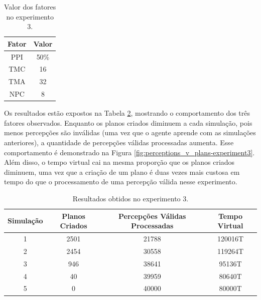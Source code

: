 \begin{table}[h!]
    \begin{center}
        \caption{ Valor dos fatores no experimento 3. }
        \label{table:experiment3factors}
        \begin{tabular}{ |c|c| }
            \hline
            \textbf{Fator} & \textbf{Valor}\\
            \hline
            PPI & 50\%\\
            \hline
            TMC & 16\\
            \hline
            TMA & 32\\
            \hline
            NPC & 8\\
            \hline
        \end{tabular}{}
    \end{center}{}
\end{table}

Os resultados estão expostos na Tabela \ref{table:experiment3results}, mostrando o comportamento dos três fatores observados. Enquanto os planos criados diminuem a cada simulação, pois menos percepções são inválidas (uma vez que o agente aprende com as simulações anteriores), a quantidade de percepções válidas processadas aumenta. Esse comportamento é demonstrado na Figura \ref{fig:perceptions_v_plans-experiment3}. Além disso, o tempo virtual cai na mesma proporção que os planos criados diminuem, uma vez que a criação de um plano é duas vezes mais custosa em tempo do que o processamento de uma percepção válida nesse experimento.

\begin{table}
    \begin{center}
        \caption{ Resultados obtidos no experimento 3. }
        \label{table:experiment3results}
        \begin{tabular}{ |c|c|c|c| }
            \hline
            \textbf{Simulação} & \textbf{Planos Criados} & \textbf{Percepções Válidas Processadas} & \textbf{Tempo Virtual}\\
            \hline
            1 & 2501 & 21788 & 120016T \\
            \hline
            2 & 2454 & 30558 & 119264T \\
            \hline
            3 & 946 & 38641 & 95136T \\
            \hline
            4 & 40 & 39959 & 80640T \\
            \hline
            5 & 0 & 40000 & 80000T \\
            \hline
        \end{tabular}{}
    \end{center}{}
\end{table}



